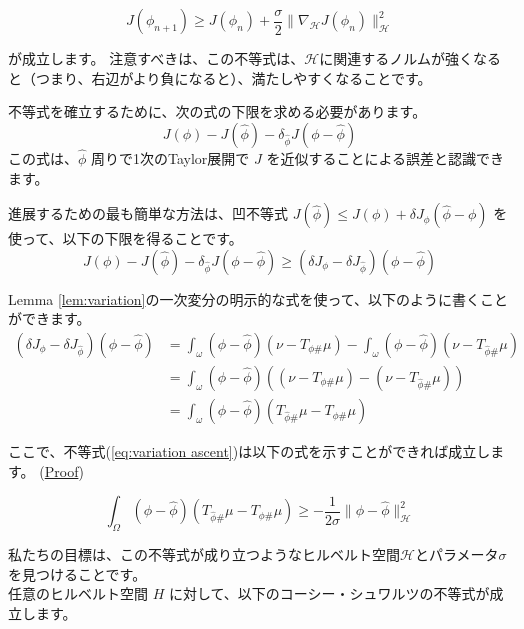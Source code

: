 \documentclass{jsarticle}
\theoremstyle{definition}
\begin{document}
$$
J(\phi_{n+1})\geq J(\phi_n) + \frac{\sigma}{2}\|\nabla_\mathcal{H}  J(\phi_n)\|_\mathcal{H}^2
$$

が成立します。
注意すべきは、この不等式は、$\mathcal{H} $に関連するノルムが強くなると（つまり、右辺がより負になると）、満たしやすくなることです。\\

{\color{teal}
不等式を確立するために、次の式の下限を求める必要があります。
$$
J(\phi) - J(\hat{\phi}) - \delta_{\hat{\phi}} J (\phi - \hat{\phi})
$$
この式は、$\hat{\phi}$ 周りで1次のTaylor展開で $J$ を近似することによる誤差と認識できます。

{\color{teal}
進展するための最も簡単な方法は、凹不等式 $J(\hat{\phi}) \le J(\phi) + \delta J_{\phi}(\hat{\phi} - \phi)$ を使って、以下の下限を得ることです。}
$$
J(\phi) - J(\hat{\phi}) - \delta_{\hat{\phi}} J(\phi-\hat{\phi}) \ge (\delta J_{\phi} - \delta J_{\hat{\phi}}) (\phi - \hat{\phi})
$$


Lemma \ref{lem:variation}の一次変分の明示的な式を使って、以下のように書くことができます。
\begin{align*}
  (\delta J_\phi - \delta J_{\hat{\phi}})(\phi - \hat{\phi})  &= \int_\omega (\phi - \hat{\phi})(\nu - T_{\phi \#} \mu) - \int_\omega (\phi - \hat{\phi})(\nu - T_{\hat{\phi} \#} \mu)\\
                                                              &= \int_\omega (\phi - \hat{\phi})\left((\nu - T_{\phi \#} \mu) - (\nu - T_{\hat{\phi} \#} \mu)\right)\\
                                                              &= \int_\omega (\phi - \hat{\phi})(T_{\hat{\phi} \#} \mu - T_{\phi \#} \mu)
\end{align*}


ここで、不等式(\ref{eq:variation ascent})は以下の式を示すことができれば成立します。  (\hyperlink{proof:eq:variation int ineq}{Proof})


\begin{equation}
  \label{eq:variation int ineq}
  \int_\Omega (\phi - \hat{\phi})(T_{\hat{\phi} \#} \mu - T_{\phi \#} \mu) \geq - \frac{1}{2\sigma} \|\phi - \hat{\phi}\|_\mathcal{H}^2
\end{equation}

私たちの目標は、この不等式が成り立つようなヒルベルト空間$\mathcal{H}$とパラメータ$\sigma$を見つけることです。\\

任意のヒルベルト空間 $H$ に対して、以下のコーシー・シュワルツの不等式が成立します。

}
\end{document}
